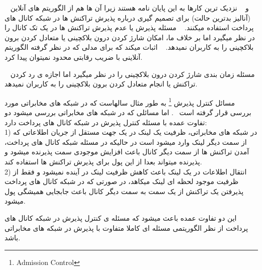 ~\cite{AvarikiotiBWW2019} و ~\cite{FazliNS2021}
نزدیک ترین کارها به این پایان نامه هستند زیرا آن ها هم از الگوریتم های آنلاین (آنالیز بدترین حالت) برای تصمیم گیری درباره پذیرش تراکنش ها در شبکه کانال های پرداخت استفاده میکنند.
~\cite{AvarikiotiBWW2019}
مسئله پذیرش یا عدم پذیرش تراکنش ها در یک تک کانال را در نظر میگیرد اما بر خلاف ما، امکان شارژ کردن درون بلاکچینی یا متعادل کردن برون بلاکچینی را به کاربران نمیدهد. 
~\cite{AvarikiotiBWW2019} 
اثبات میکند که برای مدلی که در نظر گرفته الگوریتم آنلاینی با ضریب رقابتی محدود نمیتوان پیدا کرد.

~\cite{FazliNS2021}
مسئله زمان بندی شارژ کردن درون بلاکچینی را در نظر میگیرد اما اجازه ی رد کردن تراکنش یا انجام متعادل کردن برون بلاکچینی را به کاربران نمیدهد.


مسائل کنترل پذیرش
\footnote{Admission Control}
به طور مثال  سالهاست که در شبکه های مخابراتی مورد بررسی قرار گرفته است
~\cite{aspnes1997line,lukovszki2015online}.
اما مسائلی که در شبکه های مخابراتی بررسی میشود دو تفاوت عمده با مسئله کنترل پذیرش در شبکه کانال های پرداخت دارد:\\
1) در شبکه های مخابراتی، ظرفیت یک لینک در یک جهت مستقل از جریان اطلاعاتی که از سمت دیگر لینک وارد میشود است در حالیکه در مسئله شبکه کانال های پرداخت، آمدن تراکنش ها از سمت دیگر کانال باعث افزایش موجودی سمت پذیرنده میشود و پذیرنده میتواند بعدا از این پول برای پذیرش تراکنش ها استفاده کند.\\
2) انتقال اطلاعات در یک لینک باعث کاهش ظرفیت لینک در آینده نمیشود و فقط از ظرفیت موجود لحظه ای لینک میکاهد، در صورتی که در شبکه کانال های پرداخت پذیرفتن یک تراکنش از یک سمت به سمت دیگر کانال باعث جابجایی همیشگی پول میشود.

این دو تفاوت عمده باعث میشود که مسئله ی کنترل پذیرش در شبکه کانال های پرداخت از نظر الگوریتمی مسئله ای کاملا متفاوت با پذیرش در شبکه های مخابراتی باشد.





